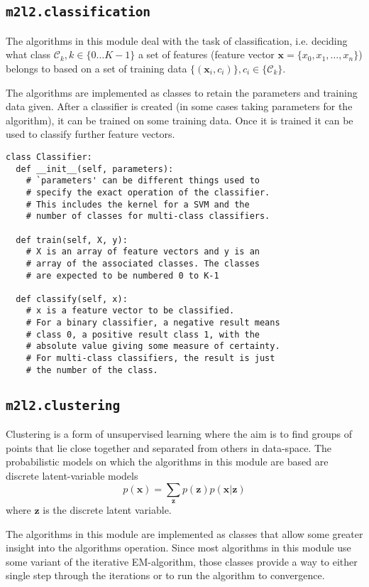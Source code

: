 \documentclass[a4paper, 12pt]{article}
\begin{document}
\subsection{\texttt{m2l2.classification}}
The algorithms in this module deal with the task of classification, i.e. deciding what class $\mathcal{C}_k, k \in \{0 \ldots K-1\}$ a set of features (feature vector $\mathbf{x} = \{x_0, x_1, \ldots, x_n\}$) belongs to based on a set of training data $\{(\mathbf{x}_i, c_i)\}, c_i \in \{\mathcal{C}_k\}$.

The algorithms are implemented as classes to retain the parameters and training data given. After a classifier is created (in some cases taking parameters for the algorithm), it can be trained on some training data. Once it is trained it can be used to classify further feature vectors.

\begin{lstlisting}[frame=TLbr,breaklines=true]
class Classifier:
  def __init__(self, parameters):
    # `parameters' can be different things used to
    # specify the exact operation of the classifier.
    # This includes the kernel for a SVM and the
    # number of classes for multi-class classifiers.
  
  def train(self, X, y):
    # X is an array of feature vectors and y is an
    # array of the associated classes. The classes
    # are expected to be numbered 0 to K-1
  
  def classify(self, x):
    # x is a feature vector to be classified.
    # For a binary classifier, a negative result means
    # class 0, a positive result class 1, with the
    # absolute value giving some measure of certainty.
    # For multi-class classifiers, the result is just
    # the number of the class.
\end{lstlisting}

\subsection{\texttt{m2l2.clustering}}
Clustering is a form of unsupervised learning where the aim is to find groups of points that lie close together and separated from others in data-space. The probabilistic models on which the algorithms in this module are based are discrete latent-variable models
\[ p(\mathbf{x}) = \sum_\mathbf{z} p(\mathbf{z}) p(\mathbf{x} | \mathbf{z}) \]
where $\mathbf{z}$ is the discrete latent variable.

The algorithms in this module are implemented as classes that allow some greater insight into the algorithms operation. Since most algorithms in this module use some variant of the iterative EM-algorithm, those classes provide a way to either single step through the iterations or to run the algorithm to convergence.
\end{document}
